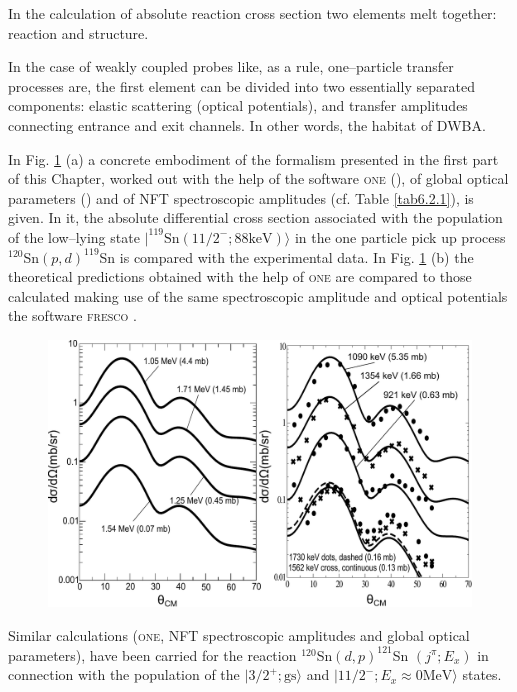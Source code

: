 \documentclass[a4paper,11pt]{book}
\numberwithin{equation}{section}
\numberwithin{figure}{section}
\numberwithin{table}{section}
\begin{document}
In the calculation of absolute reaction cross section two elements melt together: reaction and structure.


In the case of weakly coupled probes like, as a rule, one--particle transfer processes are, the first element can be divided into two essentially separated components: elastic scattering (optical potentials), and transfer amplitudes connecting entrance and exit channels. In other words, the habitat of DWBA.


In Fig. \ref{fig6.2.1} (a) a concrete embodiment of the formalism presented in the first part of this Chapter, worked out with the help of the software \textsc{one} (\cite{Potel:12b}), of global optical parameters (\cite{Dickey:82}) and of NFT spectroscopic amplitudes (cf. Table \ref{tab6.2.1}), is given. In it, the absolute differential cross section associated with the population of the low--lying state $|^{119}\text{Sn}(11/2^-;88 \text{keV})\rangle$ in the one particle pick up process $^{120}$Sn$(p,d)^{119}$Sn is compared with the experimental data. In Fig. \ref{fig6.2.1} (b) the theoretical predictions obtained with the help of \textsc{one} 	are compared to those calculated making use of the same spectroscopic amplitude and   optical potentials the software \textsc{fresco} \cite{Thompson:88}. 

  \begin{figure}
  \centerline{\includegraphics*[width=\textwidth,angle=0]{figs_C6/cross_teor_exp.pdf}}
  \caption{}\label{fig6.2.1}
  \end{figure}
Similar calculations (\textsc{one}, NFT spectroscopic amplitudes and global optical parameters), have been carried for the reaction $^{120}$Sn$(d,p)^{121}$Sn $(j^{\pi};E_x)$ in connection with the population 	of the $|3/2^+; \text{gs}\rangle$ and $|11/2^-;E_x\approx 0 \text{MeV}\rangle$ states.
\end{document}
